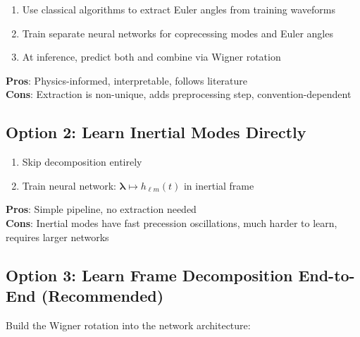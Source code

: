 \documentclass[11pt,a4paper]{article}
\newcommand{\hlm}{h_{\ell m}}
\newcommand{\veclambda}{\bm{\lambda}}
\begin{document}
\begin{enumerate}
    \item Use classical algorithms to extract Euler angles from training waveforms
    \item Train separate neural networks for coprecessing modes and Euler angles
    \item At inference, predict both and combine via Wigner rotation
\end{enumerate}

\textbf{Pros}: Physics-informed, interpretable, follows literature \\
\textbf{Cons}: Extraction is non-unique, adds preprocessing step, convention-dependent

\subsection{Option 2: Learn Inertial Modes Directly}

\begin{enumerate}
    \item Skip decomposition entirely
    \item Train neural network: $\veclambda \mapsto \hlm(t)$ in inertial frame
\end{enumerate}

\textbf{Pros}: Simple pipeline, no extraction needed \\
\textbf{Cons}: Inertial modes have fast precession oscillations, much harder to learn, requires larger networks

\subsection{Option 3: Learn Frame Decomposition End-to-End (Recommended)}

Build the Wigner rotation into the network architecture:

\begin{center}
\end{center}
\end{document}
